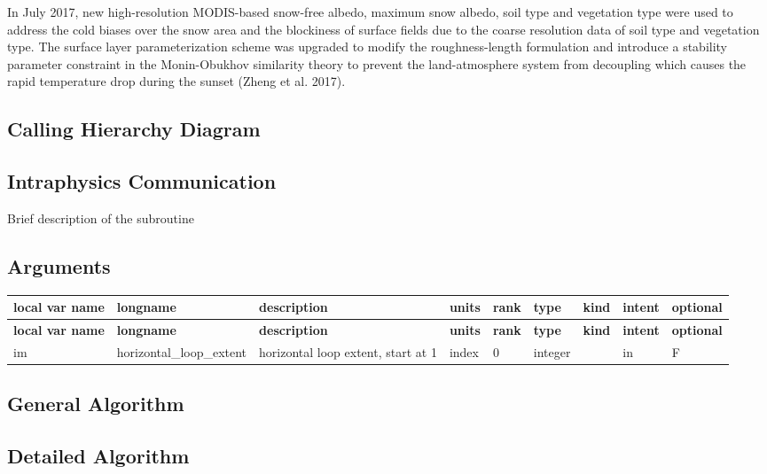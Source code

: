 In July 2017, new high-\/resolution M\+O\+D\+I\+S-\/based snow-\/free albedo, maximum snow albedo, soil type and vegetation type were used to address the cold biases over the snow area and the blockiness of surface fields due to the coarse resolution data of soil type and vegetation type. The surface layer parameterization scheme was upgraded to modify the roughness-\/length formulation and introduce a stability parameter constraint in the Monin-\/\+Obukhov similarity theory to prevent the land-\/atmosphere system from decoupling which causes the rapid temperature drop during the sunset (Zheng et al. 2017).\hypertarget{group___g_f_s___n_s_s_t_diagram}{}\subsection{Calling Hierarchy Diagram}\label{group___g_f_s___n_s_s_t_diagram}
\hypertarget{group___g_f_s___n_s_s_t_intraphysics}{}\subsection{Intraphysics Communication}\label{group___g_f_s___n_s_s_t_intraphysics}
Brief description of the subroutine\hypertarget{group___n_o_a_h_arg_table_Noah_run}{}\subsection{Arguments}\label{group___n_o_a_h_arg_table_Noah_run}
\tabulinesep=1mm
\begin{longtabu} spread 0pt [c]{*{9}{|X[-1]}|}
\hline
\rowcolor{\tableheadbgcolor}\textbf{ local var name }&\textbf{ longname }&\textbf{ description }&\textbf{ units }&\textbf{ rank }&\textbf{ type }&\textbf{ kind }&\textbf{ intent }&\textbf{ optional  }\\
\endfirsthead
\hline
\endfoot
\hline
\rowcolor{\tableheadbgcolor}\textbf{ local var name }&\textbf{ longname }&\textbf{ description }&\textbf{ units }&\textbf{ rank }&\textbf{ type }&\textbf{ kind }&\textbf{ intent }&\textbf{ optional  }\\
\endhead
im &horizontal\+\_\+loop\+\_\+extent &horizontal loop extent, start at 1 &index &0 &integer &&in &F \\
\end{longtabu}
\hypertarget{group___g_f_s___n_s_s_t_general}{}\subsection{General Algorithm}\label{group___g_f_s___n_s_s_t_general}
\hypertarget{group___g_f_s___n_s_s_t_detailed}{}\subsection{Detailed Algorithm}\label{group___g_f_s___n_s_s_t_detailed}
